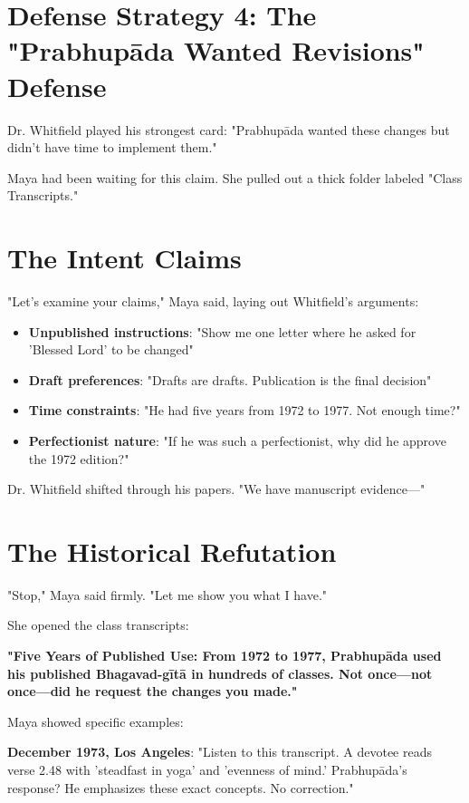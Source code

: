 \documentclass[11pt,twoside]{book}
\begin{document}
\section*{Defense Strategy 4: The "Prabhupāda Wanted Revisions" Defense}
\label{sec:orgc931d41}

Dr. Whitfield played his strongest card: "Prabhupāda wanted these changes but didn't have time to implement them."

Maya had been waiting for this claim. She pulled out a thick folder labeled "Class Transcripts."
\section*{The Intent Claims}
\label{sec:org2d9dec9}

"Let's examine your claims," Maya said, laying out Whitfield's arguments:

\begin{itemize}
\item \textbf{\textbf{Unpublished instructions}}: "Show me one letter where he asked for 'Blessed Lord' to be changed"
\item \textbf{\textbf{Draft preferences}}: "Drafts are drafts. Publication is the final decision"
\item \textbf{\textbf{Time constraints}}: "He had five years from 1972 to 1977. Not enough time?"
\item \textbf{\textbf{Perfectionist nature}}: "If he was such a perfectionist, why did he approve the 1972 edition?"
\end{itemize}

Dr. Whitfield shifted through his papers. "We have manuscript evidence—"
\section*{The Historical Refutation}
\label{sec:org5a11983}

"Stop," Maya said firmly. "Let me show you what I have."

She opened the class transcripts:

\textbf{\textbf{"Five Years of Published Use: From 1972 to 1977, Prabhupāda used his published Bhagavad-gītā in hundreds of classes. Not once—not once—did he request the changes you made."}}

Maya showed specific examples:

\textbf{\textbf{December 1973, Los Angeles}}: "Listen to this transcript. A devotee reads verse 2.48 with 'steadfast in yoga' and 'evenness of mind.' Prabhupāda's response? He emphasizes these exact concepts. No correction."
\end{document}
